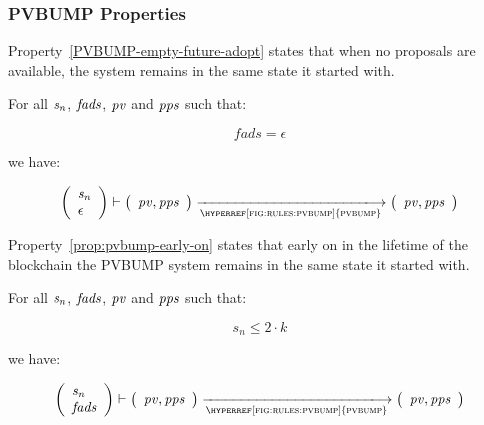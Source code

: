 \subsubsection{PVBUMP Properties}
\label{sec:pvbump-properties}

Property~\ref{PVBUMP-empty-future-adopt} states that when no proposals are
available, the system remains in the same state it started with.

\begin{property}\label{PVBUMP-empty-future-adopt}
  For all $\mathit{s_n}$, $\mathit{fads}$, $\mathit{pv}$ and $\mathit{pps}$ such
  that:

  $$fads = \epsilon$$

  we have:

  $$
  \left(
    \begin{array}{l}
      \var{s_n}\\
      \epsilon
    \end{array}
  \right)
  \vdash
  \left(
    \begin{array}{l}
      \var{pv}, \var{pps}\\
    \end{array}
  \right)
  \trans{\hyperref[fig:rules:pvbump]{pvbump}}{}
  \left(
    \begin{array}{l}
      \var{pv}, \var{pps}\\
    \end{array}
  \right)
  $$
\end{property}

Property~\ref{prop:pvbump-early-on} states that early on in the lifetime
of the blockchain the PVBUMP system remains in the same state it started with.

\begin{property}\label{prop:pvbump-early-on}
  For all $\mathit{s_n}$, $\mathit{fads}$, $\mathit{pv}$ and $\mathit{pps}$ such that:

  $$s_n \leq 2 \cdot k$$

  we have:

  $$
  \left(
    \begin{array}{l}
      \var{s_n}\\
      \var{fads}
    \end{array}
  \right)
  \vdash
  \left(
    \begin{array}{l}
      \var{pv}, \var{pps}\\
    \end{array}
  \right)
  \trans{\hyperref[fig:rules:pvbump]{pvbump}}{}
  \left(
    \begin{array}{l}
      \var{pv}, \var{pps}\\
    \end{array}
  \right)
  $$
\end{property}

